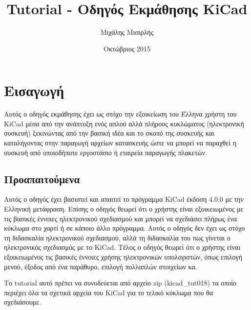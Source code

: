 \documentclass[a4paper]{article}
\title{Tutorial - Οδηγός Εκμάθησης KiCad}
\author{Μιχάλης Μισιρλής}
\date{Οκτώβριος 2015}
\begin{document}
\maketitle

\pagebreak
\tableofcontents
\pagebreak

\section{Εισαγωγή}
Αυτός ο οδηγός εκμάθησης έχει ως στόχο την εξοικείωση του Έλληνα χρήστη του \textenglish{KiCad} μέσα από την ανάπτυξη ενός απλού αλλά πλήρους κυκλώματος (ηλεκτρονική συσκευή) ξεκινώντας από την βασική ιδέα και το σκοπό της συσκευής και καταλήγοντας στην παραγωγή αρχείων κατασκευής ώστε να μπορεί να παραχθεί η συσκευή από οποιοδήποτε εργοστάσιο ή εταιρεία παραγωγής πλακετών.

\subsection{Προαπαιτούμενα}
\label{sec:prereq}
Αυτός ο οδηγός έχει βασιστεί και απαιτεί το πρόγραμμα \textenglish{KiCad} έκδοση 4.0.0 με την Ελληνική μετάφραση. Επίσης ο οδηγός θεωρεί ότι ο χρήστης είναι εξοικειωμένος με τις βασικές έννοιες ηλεκτρονικού σχεδιασμού και μπορεί να σχεδιάσει πλήρως ένα κύκλωμα στο χαρτί ή σε κάποιο άλλο πρόγραμμα. Αυτός ο οδηγός δεν έχει ως στόχο τη διδασκαλία ηλεκτρονικού σχεδιασμού, αλλά τη διδασκαλία του πως γίνεται ο ηλεκτρονικός σχεδιασμός με το \textenglish{KiCad}.
Τέλος ο οδηγός θεωρεί ότι ο χρήστης είναι εξοικειωμένος τις βασικές έννοιες χρήσης ηλεκτρονικών υπολογιστών, όπως επιλογή μενού, έξοδος από ένα παράθυρο, επιλογή πολλαπλών στοιχείων κα.

Το tutorial αυτό πρέπει να συνοδεύεται από αρχείο zip (kicad\_tut018) τα οποίο περιέχει όλα τα σχετικά αρχεία του \textenglish{KiCad} για το τελικό κύκλωμα που θα σχεδιάσουμε.
\end{document}
